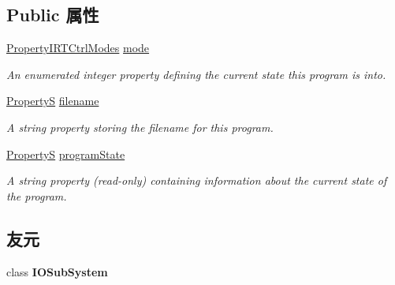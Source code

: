 \subsection*{Public 属性}
\begin{DoxyCompactItemize}
\item 
\hyperlink{group___device_specific_interface_gae76ca31bc5381777584ad1431182d5d4}{Property\+I\+R\+T\+Ctrl\+Modes} \hyperlink{classmv_i_m_p_a_c_t_1_1acquire_1_1_r_t_ctr_program_a6bce5448e7fcf2f383f829be831820eb}{mode}
\begin{DoxyCompactList}\small\item\em An enumerated integer property defining the current state this program is into. \end{DoxyCompactList}\item 
\hyperlink{classmv_i_m_p_a_c_t_1_1acquire_1_1_property_s}{Property\+S} \hyperlink{classmv_i_m_p_a_c_t_1_1acquire_1_1_r_t_ctr_program_ab43275f87f5032016f0ec4dfba643343}{filename}
\begin{DoxyCompactList}\small\item\em A string property storing the filename for this program. \end{DoxyCompactList}\item 
\hypertarget{classmv_i_m_p_a_c_t_1_1acquire_1_1_r_t_ctr_program_a35c50a3c87cf8b72ebe58ffa74d17f67}{\hyperlink{classmv_i_m_p_a_c_t_1_1acquire_1_1_property_s}{Property\+S} \hyperlink{classmv_i_m_p_a_c_t_1_1acquire_1_1_r_t_ctr_program_a35c50a3c87cf8b72ebe58ffa74d17f67}{program\+State}}\label{classmv_i_m_p_a_c_t_1_1acquire_1_1_r_t_ctr_program_a35c50a3c87cf8b72ebe58ffa74d17f67}

\begin{DoxyCompactList}\small\item\em A string property {\bfseries }(read-\/only) containing information about the current state of the program. \end{DoxyCompactList}\end{DoxyCompactItemize}
\subsection*{友元}
\begin{DoxyCompactItemize}
\item 
\hypertarget{classmv_i_m_p_a_c_t_1_1acquire_1_1_r_t_ctr_program_a3a1008d5502332da6f64a8940aa3a007}{class {\bfseries I\+O\+Sub\+System}}\label{classmv_i_m_p_a_c_t_1_1acquire_1_1_r_t_ctr_program_a3a1008d5502332da6f64a8940aa3a007}

\end{DoxyCompactItemize}
